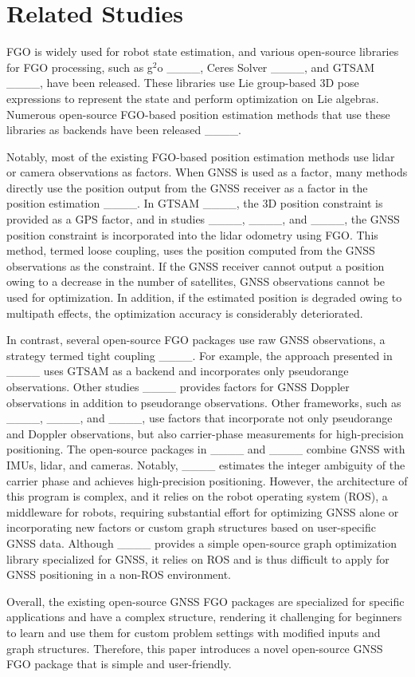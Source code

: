 \section{Related Studies}
FGO is widely used for robot state estimation, and various open-source libraries for FGO processing, such as g$^2$o ____, Ceres Solver ____, and GTSAM ____, have been released. These libraries use Lie group-based 3D pose expressions to represent the state and perform optimization on Lie algebras. Numerous open-source FGO-based position estimation methods that use these libraries as backends have been released ____.

Notably, most of the existing FGO-based position estimation methods use lidar or camera observations as factors. When GNSS is used as a factor, many methods directly use the position output from the GNSS receiver as a factor in the position estimation ____. In GTSAM ____, the 3D position constraint is provided as a GPS factor, and in studies ____, ____, and ____, the GNSS position constraint is incorporated into the lidar odometry using FGO. This method, termed loose coupling, uses the position computed from the GNSS observations as the constraint. If the GNSS receiver cannot output a position owing to a decrease in the number of satellites, GNSS observations cannot be used for optimization. In addition, if the estimated position is degraded owing to multipath effects, the optimization accuracy is considerably deteriorated.

In contrast, several open-source FGO packages use raw GNSS observations, a strategy termed tight coupling ____. For example, the approach presented in ____ uses GTSAM as a backend and incorporates only pseudorange observations. Other studies ____ provides factors for GNSS Doppler observations in addition to pseudorange observations. Other frameworks, such as ____, ____, and ____, use factors that incorporate not only pseudorange and Doppler observations, but also carrier-phase measurements for high-precision positioning. The open-source packages in ____ and ____ combine GNSS with IMUs, lidar, and cameras. Notably, ____ estimates the integer ambiguity of the carrier phase and achieves high-precision positioning. However, the architecture of this program is complex, and it relies on the robot operating system (ROS), a middleware for robots, requiring substantial effort for optimizing GNSS alone or incorporating new factors or custom graph structures based on user-specific GNSS data. Although ____ provides a simple open-source graph optimization library specialized for GNSS, it relies on ROS and is thus difficult to apply for GNSS positioning in a non-ROS environment.

Overall, the existing open-source GNSS FGO packages are specialized for specific applications and have a complex structure, rendering it challenging for beginners to learn and use them for custom problem settings with modified inputs and graph structures. Therefore, this paper introduces a novel open-source GNSS FGO package that is simple and user-friendly.

